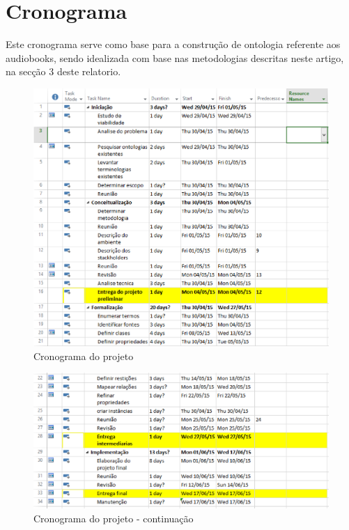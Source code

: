 \section{Cronograma}
Este cronograma serve como base para a construção de ontologia referente aos audiobooks, sendo idealizada com base nas metodologias descritas neste artigo, na secção 3 deste relatorio.

 \begin{figure}[ht]
  \centering
    \includegraphics[keepaspectratio=true,scale=0.5]{figuras/cronograma1.eps}
  \caption{Cronograma do projeto}
\end{figure}

 \begin{figure}[ht]
  \centering
    \includegraphics[keepaspectratio=true,scale=0.5]{figuras/cronograma.eps}
  \caption{Cronograma do projeto - continuação}
\end{figure}